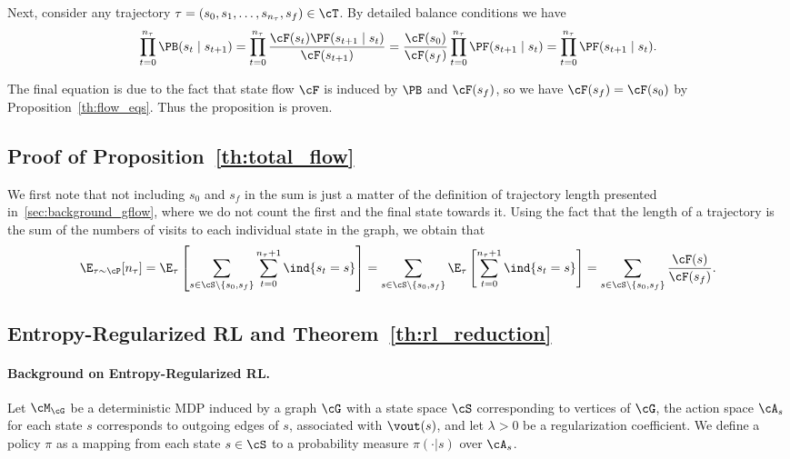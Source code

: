 Next, consider any trajectory $\tau = (s_0, s_1, \dots, s_{n_\tau}, s_f) \in \cT$. By detailed balance conditions we have
$$
\prod_{t = 0}^{n_\tau} \PB(s_t \mid s_{t + 1}) = \prod_{t = 0}^{n_\tau} \frac{\cF(s_t)\PF(s_{t+1} \mid s_t)}{\cF(s_{t+1})} = \frac{\cF(s_0)}{\cF(s_f)} \prod_{t = 0}^{n_\tau} \PF(s_{t+1} \mid s_t) = \prod_{t = 0}^{n_\tau} \PF(s_{t+1} \mid s_t).
$$

The final equation is due to the fact that state flow $\cF$ is induced by $\PB$ and $\cF(s_f)$, so we have $\cF(s_f) = \cF(s_0)$ by Proposition~\ref{th:flow_eqs}. Thus the proposition is proven.

\subsection{Proof of Proposition~\ref{th:total_flow}}\label{app:total_flow_proof}

We first note that not including $s_0$ and $s_f$ in the sum is just a matter of the definition of trajectory length presented in~\ref{sec:background_gflow}, where we do not count the first and the final state towards it. Using the fact that the length of a trajectory is the sum of the numbers of visits to each individual state in the graph, we obtain that
$$
\E_{\tau \sim \cP}[n_\tau] =\E_{\tau }\left[ \sum_{s \in \cS \setminus \{s_0, s_f\}} \sum_{t = 0}^{n_{\tau}+1} \ind\{s_t = s\}\right] = \sum_{s \in \cS \setminus \{s_0, s_f\}} \E_{\tau }\left[  \sum_{t = 0}^{n_{\tau}+1} \ind\{s_t = s\}\right] = \sum\limits_{s \in \cS \setminus \{s_0, s_f\}} \frac{\cF(s)}{\cF(s_f)}.
$$



\subsection{Entropy-Regularized RL and Theorem~\ref{th:rl_reduction}}\label{app:rl_reduction_proof}

\paragraph{Background on Entropy-Regularized RL.}

Let $\cM_{\cG}$ be a deterministic MDP induced by a graph $\cG$ with a state space $\cS$ corresponding to vertices of $\cG$, the action space $\cA_s$ for each state $s$ corresponds to outgoing edges of $s$, associated with $\vout(s)$, and let $\lambda > 0$ be a regularization coefficient. We define a policy $\pi$ as a mapping from each state $s \in \cS$ to a probability measure $\pi(\cdot|s)$ over $\cA_s$. 


